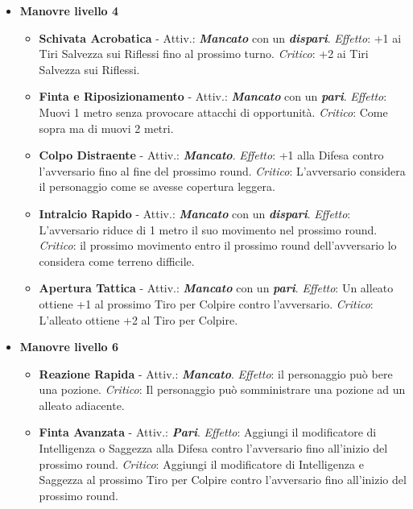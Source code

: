 \begin{multicols}{2}
\begin{itemize}[leftmargin=*]
	\item \textbf{Manovre livello 4}
	\begin{itemize}[leftmargin=*]
		\setlength{\itemsep}{0pt}
		\item \textbf{Schivata Acrobatica} - Attiv.: \textbf{\emph{Mancato}} con un \textbf{\emph{dispari}}. \emph{Effetto}: +1 ai Tiri Salvezza sui Riflessi fino al prossimo turno. \emph{Critico}: +2 ai Tiri Salvezza sui Riflessi.

		\item \textbf{Finta e Riposizionamento} - Attiv.: \textbf{\emph{Mancato}} con un \textbf{\emph{pari}}. \emph{Effetto}: Muovi 1 metro senza provocare attacchi di opportunità. \emph{Critico}: Come sopra ma di muovi 2 metri.

		\item \textbf{Colpo Distraente} - Attiv.: \textbf{\emph{Mancato}}. \emph{Effetto}: +1 alla Difesa contro l'avversario fino al fine del prossimo round. \emph{Critico}: L'avversario considera il personaggio come se avesse copertura leggera.

		\item \textbf{Intralcio Rapido} - Attiv.: \textbf{\emph{Mancato}} con un \textbf{\emph{dispari}}. \emph{Effetto}: L'avversario riduce di 1 metro il suo movimento nel prossimo round. \emph{Critico}: il prossimo movimento entro il prossimo round dell'avversario lo considera come terreno difficile.

		\item \textbf{Apertura Tattica} - Attiv.: \textbf{\emph{Mancato}} con un \textbf{\emph{pari}}. \emph{Effetto}: Un alleato ottiene +1 al prossimo Tiro per Colpire contro l'avversario. \emph{Critico}: L'alleato ottiene +2 al Tiro per Colpire.
	\end{itemize}

	\item \textbf{Manovre livello 6}
	\begin{itemize}[leftmargin=*]
		\setlength{\itemsep}{0pt}
		\item \textbf{Reazione Rapida} - Attiv.: \textbf{\emph{Mancato}}. \emph{Effetto}: il personaggio può bere una pozione. \emph{Critico}: Il personaggio può somministrare una pozione ad un alleato adiacente.

		\item \textbf{Finta Avanzata} - Attiv.: \textbf{\emph{Pari}}. \emph{Effetto}: Aggiungi il modificatore di Intelligenza o Saggezza alla Difesa contro l'avversario fino all'inizio del prossimo round. \emph{Critico}: Aggiungi il modificatore di Intelligenza e Saggezza al prossimo Tiro per Colpire contro l'avversario fino all'inizio del prossimo round.


\end{itemize}
\end{itemize}
\end{multicols}
